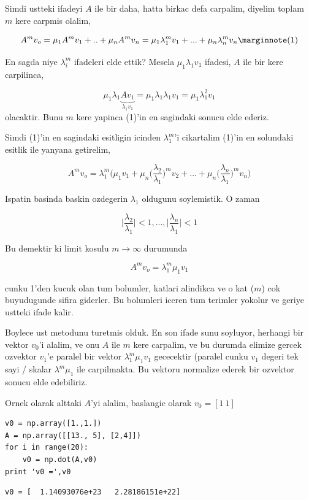 \documentclass[12pt,fleqn]{article}\usepackage{../common}
\begin{document}
Simdi ustteki ifadeyi $A$ ile bir daha, hatta birkac defa carpalim, diyelim
toplam $m$ kere carpmis olalim,


$$ A^m v_o = \mu_1 A^m v_1 + .. + \mu_n A^m v_n =
\mu_1\lambda_1^mv_1 + ... + \mu_n\lambda_n^mv_n
\mlabel{1}
$$

En sagda niye $\lambda_i^m$ ifadeleri elde ettik? Mesela $\mu_1\lambda_1v_1$ ifadesi, $A$ ile bir kere carpilinca,

$$ \mu_1\lambda_1\underbrace{Av_1}_{\lambda_1v_1} =
\mu_1\lambda_1\lambda_1v_1 = 
\mu_1\lambda_1^2v_1 
  $$
olacaktir. Bunu $m$ kere yapinca (1)'in en sagindaki sonucu elde ederiz. 

Simdi (1)'in en sagindaki esitligin icinden $\lambda_1^m$'i cikartalim
(1)'in en solundaki esitlik ile yanyana getirelim,

$$ A^m v_o = 
\lambda_1^m \bigg(  
\mu_1v_1 
+ \mu_n \bigg(\frac{\lambda_2}{\lambda_1}\bigg)^m v_2
+ ... 
+ \mu_n \bigg(\frac{\lambda_n}{\lambda_1}\bigg)^m v_n
\bigg)
$$

Ispatin basinda baskin ozdegerin $\lambda_1$ oldugunu soylemistik. O zaman 

$$ 
\bigg| \frac{\lambda_2}{\lambda_1} \bigg| < 1, ..., 
\bigg| \frac{\lambda_n}{\lambda_1} \bigg| < 1
 $$

Bu demektir ki limit kosulu $m \to \infty$ durumunda

$$ A^m v_o = \lambda_1^m  \mu_1v_1 
$$

cunku 1'den kucuk olan tum bolumler, katlari alindikca ve o kat ($m$) cok
buyudugunde sifira giderler. Bu bolumleri iceren tum terimler yokolur ve
geriye ustteki ifade kalir. 

Boylece ust metodunu turetmis olduk. En son ifade sunu soyluyor, herhangi
bir vektor $v_0$'i alalim, ve onu $A$ ile $m$ kere carpalim, ve bu durumda
elimize gercek ozvektor $v_1$'e paralel bir vektor $\lambda_1^m \mu_1v_1$
gececektir (paralel cunku $v_1$ degeri tek sayi / skalar $\lambda^m\mu_1$
ile carpilmakta. Bu vektoru normalize ederek bir ozvektor sonucu elde
edebiliriz.

Ornek olarak alttaki $A$'yi alalim, baslangic olarak $v_0 = [1 \ 1]$

\begin{verbatim}
v0 = np.array([1.,1.])
A = np.array([[13., 5], [2,4]])
for i in range(20): 
    v0 = np.dot(A,v0)
print 'v0 =',v0
\end{verbatim}

\begin{verbatim}
v0 = [  1.14093076e+23   2.28186151e+22]
\end{verbatim}
\end{document}
